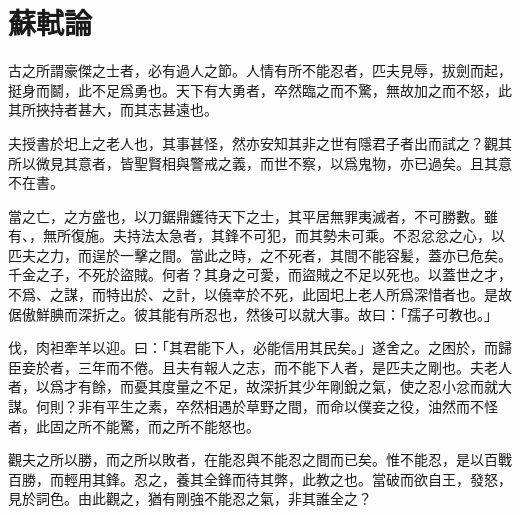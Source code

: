 \section[留侯論\quad{\small 蘇軾}]{{\normalsize 蘇軾}\quad{}論}
古之所謂豪傑之士者，必有過人之節。人情有所不能忍者，匹夫見辱，拔劍而起，挺身而鬬，此不足爲勇也。天下有大勇者，卒然臨之而不驚，無故加之而不怒，此其所挾持者甚大，而其志甚遠也。

夫授書於圯上之老人也，其事甚怪，然亦安知其非之世有隱君子者出而試之？觀其所以微見其意者，皆聖賢相與警戒之義，而世不察，以爲鬼物，亦已過矣。且其意不在書。

當之亡，之方盛也，以刀鋸鼎鑊待天下之士，其平居無{罪}夷滅者，不可勝數。雖有、，無所{復}施。夫持法太急者，其鋒不可犯，而其勢未可乘。不忍忿忿之心，以匹夫之力，而逞於一擊之間。當此之時，之不死者，其間不能容髪，蓋亦已危矣。千金之子，不死於盜賊。何者？其身之可愛，而盜賊之不足以死也。以蓋世之才，不爲、之謀，而特出於、之計，以僥幸於不死，此固圯上老人所爲深惜者也。是故倨傲鮮腆而深折之。彼其能有所忍也，然後可以就大事。故曰：「孺子可教也。」%

伐，肉袒牽羊以迎。曰：「其{君}能下人，必能信用其民矣。」遂舍之。之困於，而歸臣妾於者，三年而不倦。且夫有報人之志，而不能下人者，是匹夫之剛也。夫老人者，以爲才有餘，而憂其度量之不足，故深折其少年剛銳之氣，使之忍小忿而就大謀。何則？非有平生之素，卒然相遇於草野之間，而命以僕妾之役，油然而不怪者，此固之所不能驚，而之所不能怒也。%

觀夫之所以勝，而之所以敗者，在能忍與不能忍之間而已矣。惟不能忍，是以百戰百勝，而輕用其鋒。忍之，養其全鋒而待其{弊}，此教之也。當破而欲自王，發怒，見於詞色。由此觀之，猶有剛強不{能}忍之氣，非其誰全之？%

